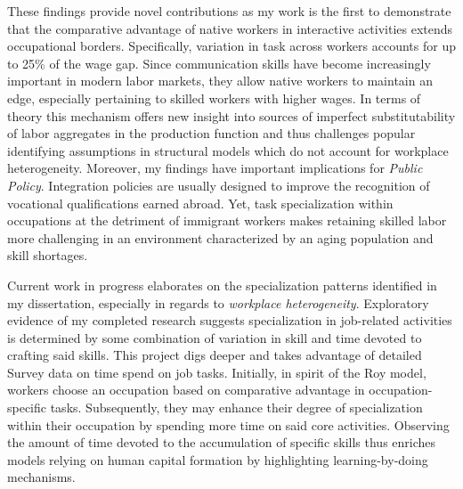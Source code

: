 \documentclass[a4paper,11pt]{article}
\begin{document}
	These findings provide novel contributions as my work is the first to demonstrate that the comparative advantage of native workers in interactive activities extends occupational borders. Specifically, variation in task across workers accounts for up to 25\% of the wage gap. Since communication skills have become increasingly important in modern labor markets, they allow native workers to maintain an edge, especially pertaining to skilled workers with higher wages. In terms of theory this mechanism offers new insight into sources of imperfect substitutability of labor aggregates in the production function and thus challenges popular identifying assumptions in structural models which do not account for workplace heterogeneity. Moreover, my findings have important implications for \textit{Public Policy}. Integration policies are usually designed to improve the recognition of vocational qualifications earned abroad. Yet, task specialization within occupations at the detriment of immigrant workers makes retaining skilled labor more challenging in an environment characterized by an aging population and skill shortages.  %
	
	Current work in progress elaborates on the specialization patterns identified in my dissertation, especially in regards to \textit{workplace heterogeneity}. Exploratory evidence of my completed research suggests specialization in job-related activities is determined by some combination of variation in skill and time devoted to crafting said skills. This project digs deeper and takes advantage of detailed Survey data on time spend on job tasks. Initially, in spirit of the Roy model, workers choose an occupation based on comparative advantage in occupation-specific tasks. Subsequently, they may enhance their degree of specialization within their occupation by spending more time on said core activities. Observing the amount of time devoted to the accumulation of specific skills thus enriches models relying on human capital formation by highlighting learning-by-doing mechanisms.
	
\end{document}
